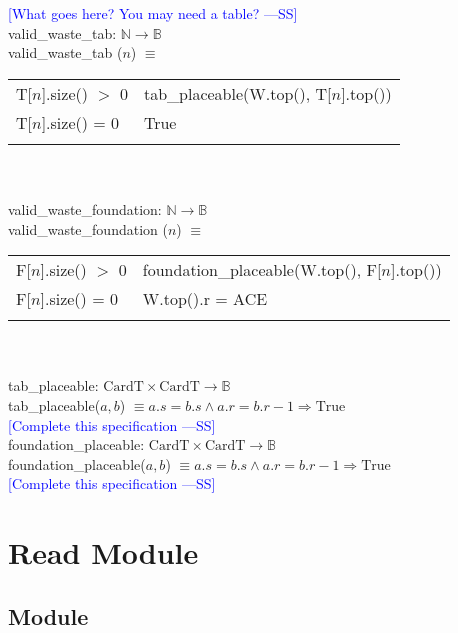 \documentclass[12pt]{article}
\newcommand{\authornote}[3]{\textcolor{#1}{[#3 ---#2]}}
\newcommand{\authornote}[3]{}
\newcommand{\wss}[1]{\authornote{blue}{SS}{#1}}
\begin{document}
\wss{What goes here?  You may need a table?}\\

\noindent valid\_waste\_tab: $\mathbb{N} \rightarrow \mathbb{B}$\\
\noindent valid\_waste\_tab ($n$) $\equiv$

\begin{tabular}{|p{4cm}|l|}
\hhline{|-|-|}
T[$n$].size() $>$ 0 & tab\_placeable(W.top(), T[$n$].top())\\
\hhline{|-|-|}
T[$n$].size() = 0 & True\\
\hhline{|-|-|}
\end{tabular}\\\\

\noindent valid\_waste\_foundation: $\mathbb{N} \rightarrow \mathbb{B}$\\
\noindent valid\_waste\_foundation ($n$) $\equiv$

\begin{tabular}{|p{4cm}|l|}
\hhline{|-|-|}
F[$n$].size() $>$ 0 & foundation\_placeable(W.top(), F[$n$].top())\\
\hhline{|-|-|}
F[$n$].size() = 0 & W.top().r = ACE\\
\hhline{|-|-|}
\end{tabular}\\\\

\noindent tab\_placeable: $\text{CardT} \times \text{CardT} \rightarrow \mathbb{B}$ \\
\noindent tab\_placeable($a, b$) $ \equiv a.s = b.s \wedge a.r = b.r - 1 \Rightarrow \text{True}$\\
\wss{Complete this specification}\\

\noindent foundation\_placeable:  $\text{CardT} \times \text{CardT} \rightarrow \mathbb{B}$ \\ 
\noindent foundation\_placeable($a, b$) $\equiv a.s = b.s \wedge a.r = b.r - 1 \Rightarrow \text{True}$\\
\wss{Complete this specification}

\newpage






\section* {Read Module}

\subsection* {Module}
\end{document}
